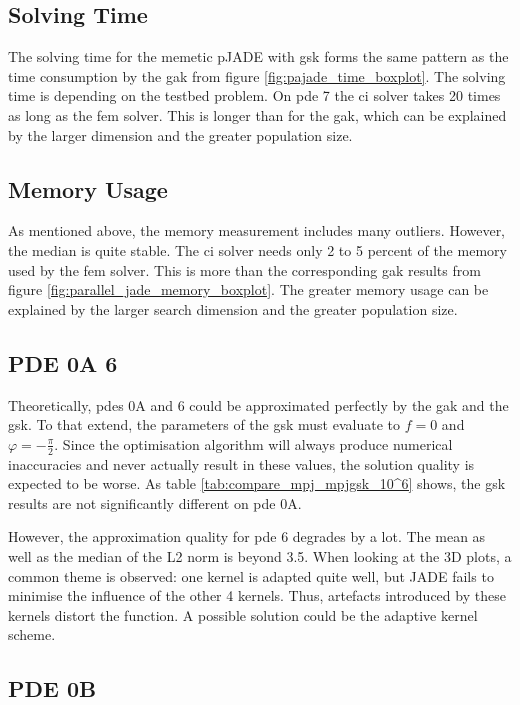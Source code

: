 \documentclass[./\jobname.tex]{subfiles}
\begin{document}
\subsection{Solving Time}
The solving time for the memetic pJADE with \gls{gsk} forms the same pattern as the time consumption by the \gls{gak} from figure \ref{fig:pajade_time_boxplot}. The solving time is depending on the testbed problem. On \gls{pde} 7 the \gls{ci} solver takes 20 times as long as the \gls{fem} solver. This is longer than for the \gls{gak}, which can be explained by the larger dimension and the greater population size.  

\subsection{Memory Usage}

As mentioned above, the memory measurement includes many outliers. However, the median is quite stable. The \gls{ci} solver needs only 2 to 5 percent of the memory used by the \gls{fem} solver. This is more than the corresponding \gls{gak} results from figure \ref{fig:parallel_jade_memory_boxplot}. The greater memory usage can be explained by the larger search dimension and the greater population size. 

\subsection{PDE 0A 6}

Theoretically, \gls{pde}s 0A and 6 could be approximated perfectly by the \gls{gak} and the \gls{gsk}. To that extend, the parameters of the \gls{gsk} must evaluate to $f=0$ and $\varphi=-\frac{\pi}{2}$. Since the optimisation algorithm will always produce numerical inaccuracies and never actually result in these values, the solution quality is expected to be worse. As table \ref{tab:compare_mpj_mpjgsk_10^6} shows, the \gls{gsk} results are not significantly different on \gls{pde} 0A. 

However, the approximation quality for \gls{pde} 6 degrades by a lot. The mean as well as the median of the L2 norm is beyond 3.5. When looking at the 3D plots, a common theme is observed: one kernel is adapted quite well, but JADE fails to minimise the influence of the other 4 kernels. Thus, artefacts introduced by these kernels distort the function. A possible solution could be the adaptive kernel scheme. 


\subsection{PDE 0B}
\end{document}
